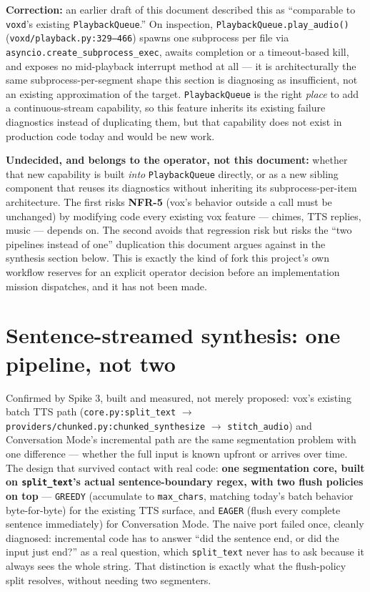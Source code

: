 \documentclass[a4paper,11pt]{report}
\newcommand{\nfr}[1]{\textbf{NFR-#1}}
\begin{document}
\textbf{Correction:} an earlier draft of this document described this as
``comparable to \texttt{voxd}'s existing \texttt{PlaybackQueue}.'' On
inspection, \texttt{PlaybackQueue.play\_audio()}
(\texttt{voxd/playback.py:329--466}) spawns one subprocess per file via
\texttt{asyncio.create\_subprocess\_exec}, awaits completion or a
timeout-based kill, and exposes no mid-playback interrupt method at all
--- it is architecturally the same subprocess-per-segment shape this
section is diagnosing as insufficient, not an existing approximation of
the target. \texttt{PlaybackQueue} is the right \emph{place} to add a
continuous-stream capability, so this feature inherits its existing
failure diagnostics instead of duplicating them, but that capability does
not exist in production code today and would be new work.

\textbf{Undecided, and belongs to the operator, not this document:}
whether that new capability is built \emph{into} \texttt{PlaybackQueue}
directly, or as a new sibling component that reuses its diagnostics
without inheriting its subprocess-per-item architecture. The first risks
\nfr{5} (vox's behavior outside a call must be unchanged) by modifying
code every existing vox feature --- chimes, TTS replies, music ---
depends on. The second avoids that regression risk but risks the
``two pipelines instead of one'' duplication this document argues against
in the synthesis section below. This is exactly the kind of fork this
project's own workflow reserves for an explicit operator decision before
an implementation mission dispatches, and it has not been made.

\section{Sentence-streamed synthesis: one pipeline, not two}

Confirmed by Spike 3, built and measured, not merely proposed: vox's
existing batch TTS path (\texttt{core.py:split\_text} $\to$
\texttt{providers/chunked.py:chunked\_synthesize} $\to$
\texttt{stitch\_audio}) and Conversation Mode's incremental path are the
same segmentation problem with one difference --- whether the full input
is known upfront or arrives over time. The design that survived contact
with real code: \textbf{one segmentation core, built on
\texttt{split\_text}'s actual sentence-boundary regex, with two flush
policies on top} --- \texttt{GREEDY} (accumulate to \texttt{max\_chars},
matching today's batch behavior byte-for-byte) for the existing TTS
surface, and \texttt{EAGER} (flush every complete sentence immediately)
for Conversation Mode. The naive port failed once, cleanly diagnosed:
incremental code has to answer ``did the sentence end, or did the input
just end?'' as a real question, which \texttt{split\_text} never has to
ask because it always sees the whole string. That distinction is exactly
what the flush-policy split resolves, without needing two segmenters.
\end{document}
